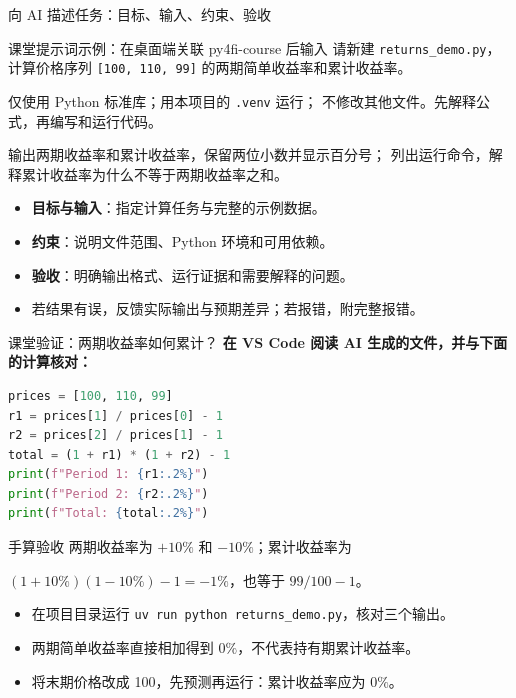 \documentclass[9pt]{ctexbeamer}
\begin{document}
\begin{frame}{向 AI 描述任务：目标、输入、约束、验收}
  \begin{block}{课堂提示词示例：在桌面端关联 py4fi-course 后输入}
    请新建 \texttt{returns\_demo.py}，计算价格序列
    \texttt{[100, 110, 99]} 的两期简单收益率和累计收益率。\par\medskip
    仅使用 Python 标准库；用本项目的 \texttt{.venv} 运行；
    不修改其他文件。先解释公式，再编写和运行代码。\par\medskip
    输出两期收益率和累计收益率，保留两位小数并显示百分号；
    列出运行命令，解释累计收益率为什么不等于两期收益率之和。
  \end{block}
  \begin{itemize}
    \item \textbf{目标与输入}：指定计算任务与完整的示例数据。
    \item \textbf{约束}：说明文件范围、Python 环境和可用依赖。
    \item \textbf{验收}：明确输出格式、运行证据和需要解释的问题。
    \item 若结果有误，反馈实际输出与预期差异；若报错，附完整报错。
  \end{itemize}
\end{frame}

\begin{frame}[fragile]{课堂验证：两期收益率如何累计？}
  \textbf{在 VS Code 阅读 AI 生成的文件，并与下面的计算核对：}
\begin{lstlisting}[language=Python,numbers=none]
prices = [100, 110, 99]
r1 = prices[1] / prices[0] - 1
r2 = prices[2] / prices[1] - 1
total = (1 + r1) * (1 + r2) - 1
print(f"Period 1: {r1:.2%}")
print(f"Period 2: {r2:.2%}")
print(f"Total: {total:.2%}")
\end{lstlisting}
  \begin{block}{手算验收}
    两期收益率为 $+10\%$ 和 $-10\%$；累计收益率为\par
    $(1+10\%)(1-10\%)-1=-1\%$，也等于 $99/100-1$。
  \end{block}
  \begin{itemize}
    \item 在项目目录运行 \texttt{uv run python returns\_demo.py}，核对三个输出。
    \item 两期简单收益率直接相加得到 $0\%$，不代表持有期累计收益率。
    \item 将末期价格改成 100，先预测再运行：累计收益率应为 $0\%$。
  \end{itemize}
\end{frame}
\end{document}
